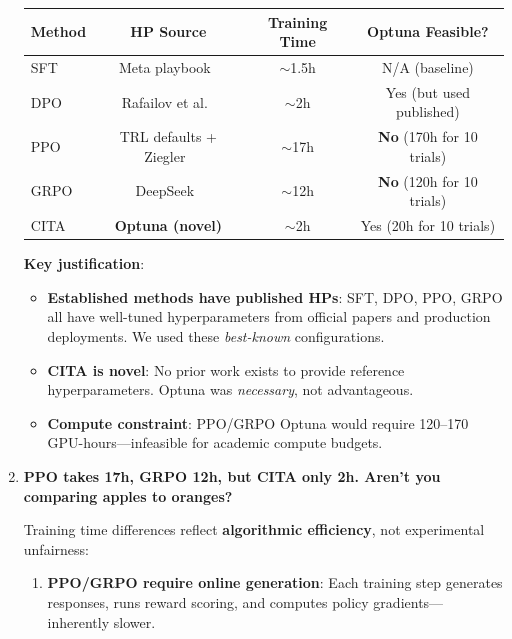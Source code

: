 \begin{enumerate}[label=\textbf{Q\arabic*.}, leftmargin=*, itemsep=8pt]
\begin{table}[H]
\centering
\small
\begin{tabular}{@{}lccc@{}}
\toprule
\textbf{Method} & \textbf{HP Source} & \textbf{Training Time} & \textbf{Optuna Feasible?} \\
\midrule
SFT & Meta playbook~\cite{dubey2024llama} & $\sim$1.5h & N/A (baseline) \\
\hline
DPO & Rafailov et al.~\cite{rafailov2023direct} & $\sim$2h & Yes (but used published) \\
\hline
PPO & TRL defaults + Ziegler~\cite{ziegler2019fine} & $\sim$17h & \textbf{No} (170h for 10 trials) \\
\hline
GRPO & DeepSeek~\cite{shao2024deepseekmath} & $\sim$12h & \textbf{No} (120h for 10 trials) \\
\hline
CITA & \textbf{Optuna (novel)} & $\sim$2h & Yes (20h for 10 trials) \\
\bottomrule
\end{tabular}
\end{table}

\textbf{Key justification}:
\begin{itemize}[leftmargin=*,itemsep=2pt]
    \item \textbf{Established methods have published HPs}: SFT, DPO, PPO, GRPO all have well-tuned hyperparameters from official papers and production deployments. We used these \textit{best-known} configurations.
    \item \textbf{CITA is novel}: No prior work exists to provide reference hyperparameters. Optuna was \textit{necessary}, not advantageous.
    \item \textbf{Compute constraint}: PPO/GRPO Optuna would require 120--170 GPU-hours---infeasible for academic compute budgets.
\end{itemize}

\vspace{4mm}

\item \textbf{PPO takes 17h, GRPO 12h, but CITA only 2h. Aren't you comparing apples to oranges?}

 Training time differences reflect \textbf{algorithmic efficiency}, not experimental unfairness:

\begin{enumerate}[leftmargin=*,itemsep=2pt]
    \item \textbf{PPO/GRPO require online generation}: Each training step generates responses, runs reward scoring, and computes policy gradients---inherently slower.


\end{enumerate}
\end{enumerate}
